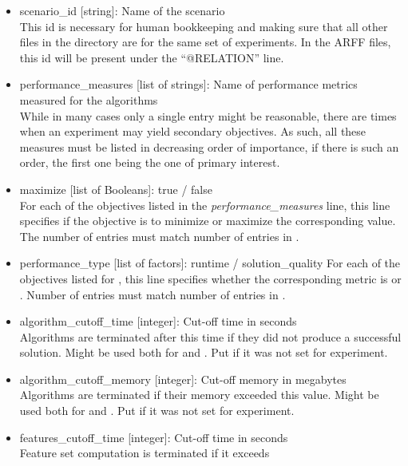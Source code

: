 \documentclass[]{elsarticle}
\begin{document}
\begin{itemize}
	\item scenario\_id [string]: Name of the scenario\\ 
		This id is necessary for human bookkeeping and making sure that all
		other files in the directory are for the same set of experiments. In the ARFF files, this id will be present 
		under the ``@RELATION'' line.
  	\item performance\_measures [list of strings]: Name of performance metrics measured for 
		the algorithms\\
		While in many cases only a single entry might be reasonable, there are times when an 
		experiment may yield secondary objectives. As such, all these measures must be listed in decreasing 
		order of importance, if there is such an order, the first one being the one of primary interest.
  	\item maximize [list of Booleans]: true / false\\ 
  	    For each of the objectives listed in the \textit{performance\_measures} line,
		this line specifies if the objective is to minimize or maximize the corresponding value. The number of entries 
		must match number of entries in .
  	\item performance\_type [list of factors]: runtime / solution\_quality
  	    For each of the objectives listed for ,
		this line specifies whether the corresponding metric is 
		or . Number of entries must match number of entries in 
		.
 	\item algorithm\_cutoff\_time [integer]: Cut-off time in seconds\\ 
 	    Algorithms are terminated after this time if they did 
		not produce a successful solution. Might be used both for  and .
  	      	Put \qm if it was not set for experiment.
  	\item algorithm\_cutoff\_memory [integer]: Cut-off memory in megabytes\\
  	    Algorithms are terminated if their memory
		exceeded this value. Might be used both for  and . Put \qm if it 
		was not set for experiment. 
  	\item features\_cutoff\_time [integer]: Cut-off time in seconds\\
  	    Feature set computation is terminated if it exceeds 

\end{itemize}
\end{document}

